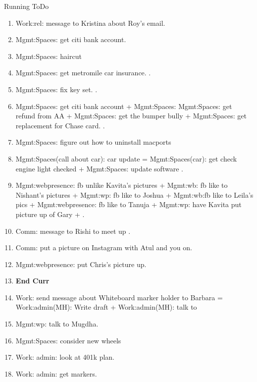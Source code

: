 \begin{frame}
\begin{columns}
\begin{column}{0.5\linewidth}
\begin{block}{Running ToDo}
\begin{enumerate}
        \item \tiny Work:rel: message to Kristina about Roy's email.   
        \item \tiny Mgmt:Spaces: get citi bank account.  
        \item \tiny Mgmt:Spaces: haircut  
        \item \tiny Mgmt:Spaces: get metromile car insurance.   . 
        \item \tiny Mgmt:Spaces: fix key set. . 
        \item \tiny Mgmt:Spaces: get citi bank account +  Mgmt:Spaces:
          Mgmt:Spaces: get refund from AA  + Mgmt:Spaces: get the
          bumper bully +  Mgmt:Spaces: get replacement for Chase card. .
          \item \tiny Mgmt:Spaces: figure out how to uninstall macports 
 
        \item \tiny Mgmt:Spaces(call about car): car update = Mgmt:Spaces(car): get check engine light checked +
          Mgmt:Spaces: update software . 
 
        \item \tiny Mgmt:webpresence: fb unlike Kavita’s pictures + Mgmt:wb:
          fb like to Nishant's pictures +  Mgmt:wp: fb like to Joshua
          + Mgmt:wb:fb like to Leila's pics + Mgmt:webpresence: fb
          like to Tanuja + Mgmt:wp: have Kavita put picture up of Gary  + . 

        \item \tiny Comm: message to Rishi to meet up .
        \item \tiny Comm: put a picture on Instagram with Atul and you on. 
        \item \tiny Mgmt:webpresence: put Chris's picture up.
        
        \item \tiny  \textbf{End Curr} 
        \item \tiny Work: send message about Whiteboard marker holder to
          Barbara = Work:admin(MH): Write draft +
          Work:admin(MH): talk to 

        \item \tiny Mgmt:wp: talk to Mugdha. 


        \item \tiny  Mgmt:Spaces: consider new wheels 
        \item \tiny Work: admin: look at 401k plan. 
        \item \tiny Work: admin: get markers.
         

\end{enumerate}
\end{block}
\end{column}
\end{columns}
\end{frame}
